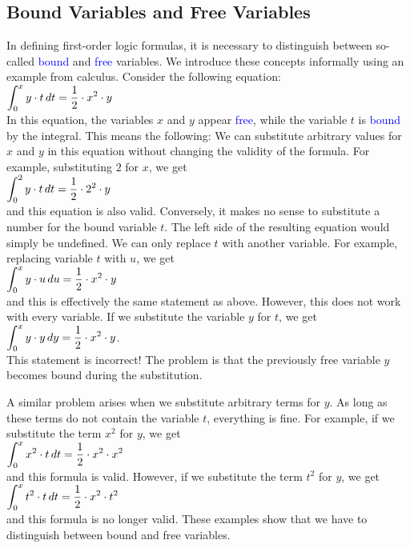 \subsection{Bound Variables and Free Variables}
In defining first-order logic formulas, it is necessary
to distinguish between so-called \textcolor{blue}{bound} and \textcolor{blue}{free}
variables.
We introduce these concepts informally using an example from calculus.
Consider the following equation: \\[0.2cm]
\hspace*{1.3cm}
$\displaystyle\int_{0}^{x} y \cdot t\, dt = \frac{1}{2} \cdot x^2 \cdot y$
\\[0.2cm]
In this equation, the variables $x$ and $y$ appear \textcolor{blue}{free}, while the variable $t$ is \textcolor{blue}{bound} by the integral.
This means the following: We can substitute arbitrary values for $x$ and $y$ in this equation without
changing the validity of the formula. For example, substituting $2$ for $x$, we get \\[0.2cm]
\hspace*{1.3cm}
$\displaystyle\int_{0}^{2} y \cdot t\, dt = \frac{1}{2} \cdot 2^2 \cdot y$ \\[0.2cm]
and this equation is also valid. Conversely, it makes no sense to substitute a number for the bound variable
$t$.
The left side of the resulting equation would simply be undefined. We can only replace $t$
with another variable.
For example, replacing variable $t$ with $u$, we get \\[0.2cm]
\hspace*{1.3cm}
$\displaystyle\int_{0}^{x} y \cdot u\, du = \frac{1}{2} \cdot x^2 \cdot y$
\\[0.2cm]
and this is effectively the same statement as above. However, this does not work with every variable. If we
substitute the variable $y$ for $t$, we get \\[0.2cm]
\hspace*{1.3cm}
$\displaystyle\int_{0}^{x} y \cdot y\, dy = \frac{1}{2} \cdot x^2 \cdot y$. \\[0.2cm]
This statement is incorrect! The problem is that the previously free variable
$y$ becomes bound during the substitution.

A similar problem arises when we substitute arbitrary terms for $y$. As long as these terms do not contain the variable $t$,
everything is fine. For example, if we substitute the term $x^2$ for $y$, we get \\[0.2cm]
\hspace*{1.3cm}
$\displaystyle\int_{0}^{x} x^2 \cdot t\, dt = \frac{1}{2} \cdot x^2 \cdot x^2$
\\[0.2cm]
and this formula is valid. However, if we substitute the term $t^2$ for $y$, we get \\[0.2cm]
\hspace*{1.3cm}
$\displaystyle\int_{0}^{x} t^2 \cdot t\, dt = \frac{1}{2} \cdot x^2 \cdot t^2$
\\[0.2cm]
and this formula is no longer valid.  These examples show that we have to distinguish between bound and free
variables. 

